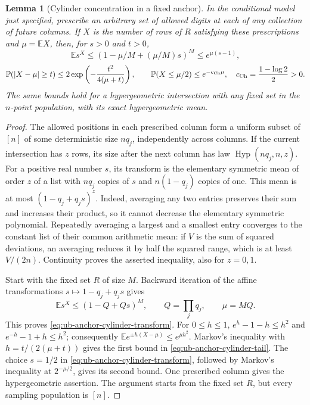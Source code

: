 \documentclass[11pt]{article}
\numberwithin{equation}{section}
\newtheorem{lemma}[lemma]{Lemma}
\newcommand{\E}{\mathbb E}
\newcommand{\Pp}{\mathbb P}
\newcommand{\1}{\mathbf 1}
\begin{document}
\begin{lemma}[Cylinder concentration in a fixed anchor]
\label{lem:ub-anchor-cylinder-tail}
In the conditional model just specified, prescribe an arbitrary set of
allowed digits at each of any collection of future columns.  If $X$ is
the number of rows of $R$ satisfying these prescriptions and $\mu=\E X$,
then, for $s>0$ and $t>0$,
\begin{equation}
\label{eq:ub-anchor-cylinder-transform}
 \E s^X\le(1-\mu/M+(\mu/M)s)^M\le e^{\mu(s-1)},
\end{equation}
\begin{equation}
\label{eq:ub-anchor-cylinder-tail}
 \Pp(|X-\mu|\ge t)\le
 2\exp\left(-\frac{t^2}{4(\mu+t)}\right),\qquad
 \Pp(X\le\mu/2)\le e^{-c_{\rm Ch}\mu},
 \quad c_{\rm Ch}=\frac{1-\log2}{2}>0.
\end{equation}
The same bounds hold for a hypergeometric intersection with any fixed
set in the $n$-point population, with its exact hypergeometric mean.
\end{lemma}

\begin{proof}
The allowed positions in each prescribed column form a uniform subset
of $[n]$ of some deterministic size $nq_j$, independently across
columns.  If the current intersection has $z$ rows, its size after
the next column has law $\operatorname{Hyp}(nq_j,n,z)$.  For a
positive real number $s$, its transform is the elementary symmetric
mean of order $z$ of a list with $nq_j$ copies of $s$ and $n(1-q_j)$
copies of one.  This mean is at most $(1-q_j+q_js)^z$.
Indeed, averaging any two entries preserves their sum and increases
their product, so it cannot decrease the elementary symmetric
polynomial.  Repeatedly averaging a largest and a smallest entry
converges to the constant list of their common arithmetic mean:
if $V$ is the sum of squared deviations, an averaging reduces it by
half the squared range, which is at least $V/(2n)$.  Continuity proves
the asserted inequality, also for $z=0,1$.

Start with the fixed set $R$ of size $M$.  Backward iteration of the
affine transformations $s\mapsto1-q_j+q_js$ gives
\[
 \E s^X\le(1-Q+Qs)^M,\qquad Q=\prod_jq_j,\qquad \mu=MQ.
\]
This proves \eqref{eq:ub-anchor-cylinder-transform}.  For $0\le h\le1$,
$e^{h}-1-h\le h^2$ and $e^{-h}-1+h\le h^2$; consequently
$\E e^{\pm h(X-\mu)}\le e^{\mu h^2}$.
Markov's inequality with $h=t/(2(\mu+t))$ gives the first bound in
\eqref{eq:ub-anchor-cylinder-tail}.  The choice $s=1/2$ in
\eqref{eq:ub-anchor-cylinder-transform}, followed by Markov's inequality
at $2^{-\mu/2}$, gives its second bound.  One prescribed column gives
the hypergeometric assertion.  The argument starts from the fixed
set $R$, but every sampling population is $[n]$.
\end{proof}
\end{document}

